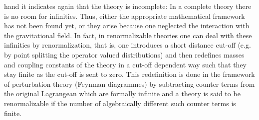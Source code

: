 \documentclass[12pt]{report}
\begin{document}
\begin{itemize}
hand it indicates again that the theory is incomplete: In a complete 
theory there is no room for infinities. Thus, either the appropriate 
mathematical framework has not been found yet, or they arise because one
neglected the interaction with the gravitational field. In fact, 
in renormalizable theories one can deal with these infinities by 
renormalization, that is, one introduces a short distance cut-off (e.g. by 
point splitting the operator valued distributions) and then redefines 
masses and coupling constants of the theory in a cut-off dependent 
way such that they stay finite as the cut-off is sent to zero. 
This redefinition is done in the framework of perturbation theory 
(Feynman diagrammes) by subtracting counter terms from the original
Lagrangean which are formally infinite and a theory is said to be 
renormalizable if the number of algebraically different such counter 
terms is finite.


\end{itemize}
\end{document}
